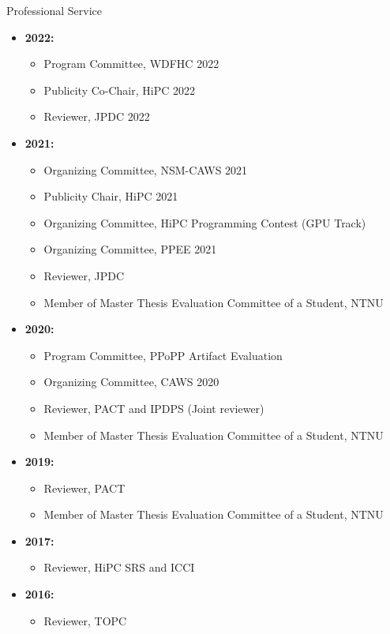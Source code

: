\documentclass{resume} %
\begin{document}
\begin{rSection}{Professional Service}
\begin{itemize}
	\item \textbf{2022:}
	\begin{itemize}	
		\item Program Committee, WDFHC 2022	
		\item Publicity Co-Chair, HiPC 2022
		\item Reviewer, JPDC 2022
	\end{itemize}
	\item \textbf{2021:}
	\begin{itemize}
		\item Organizing Committee, NSM-CAWS 2021		
		\item Publicity Chair, HiPC 2021
		\item Organizing Committee, HiPC Programming Contest (GPU Track)
		\item Organizing Committee, PPEE 2021
		\item Reviewer, JPDC
		\item Member of Master Thesis Evaluation Committee of a Student, NTNU
	\end{itemize}
	\item \textbf{2020:}
	\begin{itemize}
		\item Program Committee, PPoPP Artifact Evaluation
		\item Organizing Committee, CAWS 2020
		\item Reviewer, PACT and IPDPS (Joint reviewer)
		\item Member of Master Thesis Evaluation Committee of a Student, NTNU
	\end{itemize}
	\item  \textbf{2019:}
	\begin{itemize}
		\item Reviewer, PACT
		\item Member of Master Thesis Evaluation Committee of a Student, NTNU
	\end{itemize}
	\item  \textbf{2017:}
	\begin{itemize}
		\item Reviewer, HiPC SRS and ICCI
	\end{itemize}
	\item  \textbf{2016:}
	\begin{itemize}
		\item Reviewer, TOPC
	\end{itemize}
\end{itemize}
\end{rSection}
\end{document}
